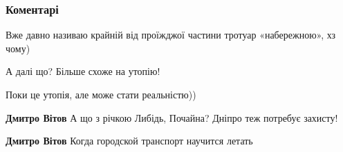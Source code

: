  
 
 
 
 
\subsubsection{Коментарі}

\begin{itemize} %
Вже давно називаю крайній від проїжджої частини тротуар «набережною», хз чому)

А далі що? Більше схоже на утопію!

\begin{itemize} %
Поки це утопія, але може стати реальністю))

\textbf{Дмитро Вітов} А що з річкою Либідь, Почайна? Дніпро теж потребує захисту!

\textbf{Дмитро Вітов} Когда городской транспорт научится летать
\end{itemize} %

\end{itemize} %
